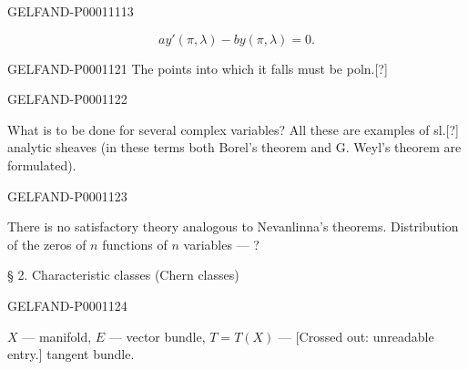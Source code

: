 \begin{GelfandAdjacentEvidence}{GELFAND-P000111}{13}

\begin{equation*}ay'(\pi,\lambda)-by(\pi,\lambda)=0.\end{equation*}
\end{GelfandAdjacentEvidence}



\begin{GelfandAdjacentEvidence}{GELFAND-P000112}{1}
The points into which it falls must be poln.[?]
\end{GelfandAdjacentEvidence}
\begin{GelfandAdjacentEvidence}{GELFAND-P000112}{2}

What is to be done for several complex variables?
All these are examples of sl.[?] analytic sheaves (in these terms both Borel's theorem and G. Weyl's theorem are formulated).
\end{GelfandAdjacentEvidence}
\begin{GelfandAdjacentEvidence}{GELFAND-P000112}{3}

There is no satisfactory theory analogous to Nevanlinna's theorems.
Distribution of the zeros of $n$ functions of $n$ variables — ?

§ 2. Characteristic classes (Chern classes)
\end{GelfandAdjacentEvidence}
\begin{GelfandAdjacentEvidence}{GELFAND-P000112}{4}

$X$ — manifold, $E$ — vector bundle, $T=T(X)$ —
[Crossed out: unreadable entry.] tangent bundle.
\end{GelfandAdjacentEvidence}
